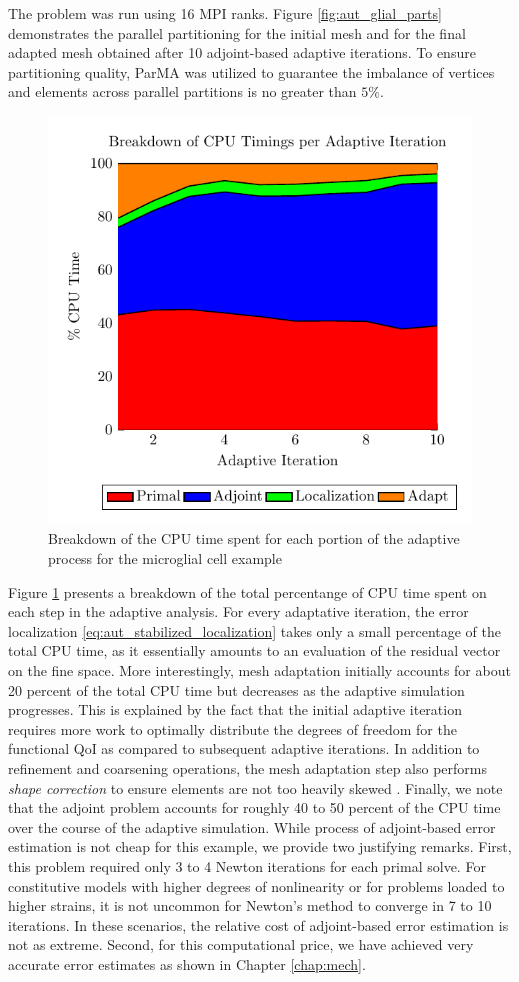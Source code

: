 The problem was run using 16 MPI ranks. Figure \ref{fig:aut_glial_parts}
demonstrates the parallel partitioning for the initial mesh and for
the final adapted mesh obtained after 10 adjoint-based adaptive
iterations. To ensure partitioning quality, ParMA was
utilized to guarantee the imbalance of vertices and elements
across parallel partitions is no greater than $5\%$.

\begin{figure}[ht!]
\centering
\includegraphics[width=0.75\linewidth]{img/aut_glial_timings.pdf}
\caption{Breakdown of the CPU time spent for each portion of
the adaptive process for the microglial cell example}
\label{fig:aut_glial_timings}
\end{figure}

Figure \ref{fig:aut_glial_timings} presents a breakdown of the
total percentange of CPU time spent on each step in the
adaptive analysis. For every adaptative iteration, the error
localization \eqref{eq:aut_stabilized_localization} takes only
a small percentage of the total CPU time, as it essentially amounts
to an evaluation of the residual vector on the fine space. More
interestingly, mesh adaptation initially accounts for about
20 percent of the total CPU time but decreases as the adaptive
simulation progresses. This is explained by the fact that the initial
adaptive iteration requires more work to optimally distribute
the degrees of freedom for the functional QoI as compared to
subsequent adaptive iterations. In addition to refinement
and coarsening operations, the mesh adaptation step also
performs \emph{shape correction} to ensure elements are not
too heavily skewed \cite{li20053d}. Finally, we note that the
adjoint problem accounts for roughly 40 to 50 percent of the CPU time
over the course of the adaptive simulation. While process of
adjoint-based error estimation is not cheap for this example,
we provide two justifying remarks. First, this problem required only
3 to 4 Newton iterations for each primal solve. For constitutive
models with higher degrees of nonlinearity or for problems loaded to
higher strains, it is not uncommon for Newton's method to converge
in 7 to 10 iterations. In these scenarios, the relative cost of
adjoint-based error estimation is not as extreme.
Second, for this computational price, we have
achieved very accurate error estimates as shown in
Chapter \ref{chap:mech}.


